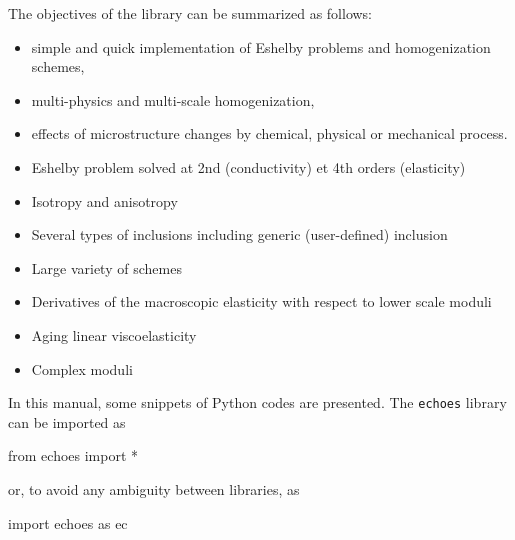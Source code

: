 \documentclass[
  letterpaper,
  DIV=11,
  numbers=noendperiod]{scrreprt}
\newenvironment{Shaded}{\begin{snugshade}}{\end{snugshade}}
\newcommand{\ImportTok}[1]{\textcolor[rgb]{0.00,0.46,0.62}{#1}}
\newcommand{\NormalTok}[1]{\textcolor[rgb]{0.00,0.23,0.31}{#1}}
\newcommand{\OperatorTok}[1]{\textcolor[rgb]{0.37,0.37,0.37}{#1}}
\begin{document}
The objectives of the library can be summarized as follows:

\begin{itemize}
\item
  simple and quick implementation of Eshelby problems and homogenization
  schemes,
\item
  multi-physics and multi-scale homogenization,
\item
  effects of microstructure changes by chemical, physical or mechanical
  process.
\end{itemize}

\begin{tcolorbox}[enhanced jigsaw, left=2mm, bottomrule=.15mm, colbacktitle=quarto-callout-note-color!10!white, colback=white, colframe=quarto-callout-note-color-frame, rightrule=.15mm, bottomtitle=1mm, toptitle=1mm, titlerule=0mm, title={Features}, toprule=.15mm, arc=.35mm, opacityback=0, opacitybacktitle=0.6, leftrule=.75mm, breakable, coltitle=black]

\begin{itemize}
\item
  Eshelby problem solved at 2nd (conductivity) et 4th orders
  (elasticity)
\item
  Isotropy and anisotropy
\item
  Several types of inclusions including generic (user-defined) inclusion
\item
  Large variety of schemes
\item
  Derivatives of the macroscopic elasticity with respect to lower scale
  moduli
\item
  Aging linear viscoelasticity
\item
  Complex moduli
\end{itemize}

\end{tcolorbox}

In this manual, some snippets of Python codes are presented. The
\texttt{echoes} library can be imported as

\begin{Shaded}
\begin{Highlighting}[]
\ImportTok{from}\NormalTok{ echoes }\ImportTok{import} \OperatorTok{*}
\end{Highlighting}
\end{Shaded}

or, to avoid any ambiguity between libraries, as

\begin{Shaded}
\begin{Highlighting}[]
\ImportTok{import}\NormalTok{ echoes }\ImportTok{as}\NormalTok{ ec}
\end{Highlighting}
\end{Shaded}
\end{document}
